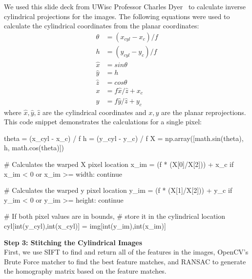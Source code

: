 \documentclass[10pt,twocolumn,letterpaper]{article}
\begin{document}
We used this slide deck from UWisc Professor Charles Dyer~\cite{dyer} to calculate inverse cylindrical projections for the images. The following equations were used to calculate the cylindrical coordinates from the planar coordinates:
\begin{align}
\theta &= (x_{cyl} - x_c)/f\\
h &= (y_{cyl} - y_c)/f\\
\hat{x} &= sin\theta \\
\hat{y} &= h \\
\hat{z} &= cos\theta \\
x &= f\hat{x}/\hat{z} + x_c \\
y &= f\hat{y}/\hat{z} + y_c
\label{eq:cylindrical}
\end{align}
where $\hat{x}, \hat{y}, \hat{z}$ are the cylindrical coordinates and $x, y$ are the planar reprojections. This code snippet demonstrates the calculations for a single pixel:
\begin{python}
theta = (x_cyl - x_c) / f
h = (y_cyl - y_c) / f
X = np.array([math.sin(theta), h, 
    math.cos(theta)])

# Calculates the warped X pixel location
x_im = (f * (X[0]/X[2])) + x_c
if x_im < 0 or x_im >= width:
    continue
    
# Calculates the warped y pixel location
y_im = (f * (X[1]/X[2])) + y_c
if y_im < 0 or y_im >= height:
    continue
    
# If both pixel values are in bounds, 
# store it in the cylindrical location
cyl[int(y_cyl),int(x_cyl)] 
    = img[int(y_im),int(x_im)]
\end{python}

\bigskip
\noindent\textbf{Step 3: Stitching the Cylindrical Images}\\

First, we use SIFT to find and return all of the features in the images, OpenCV's Brute Force matcher to find the best feature matches, and RANSAC to generate the homography matrix based on the feature matches.
\end{document}
